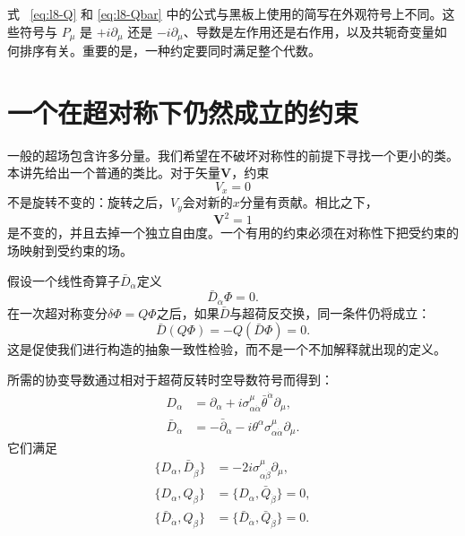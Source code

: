 式 ~\eqref{eq:l8-Q} 和 \eqref{eq:l8-Qbar} 中的公式与黑板上使用的简写在外观符号上不同。这些符号与 \(P_\mu\) 是 \(+i\partial_\mu\) 还是 \(-i\partial_\mu\)、导数是左作用还是右作用，以及共轭奇变量如何排序有关。重要的是，一种约定要同时满足整个代数。

\section{一个在超对称下仍然成立的约束}

一般的超场包含许多分量。我们希望在不破坏对称性的前提下寻找一个更小的类。本讲先给出一个普通的类比。对于矢量\(\mathbf V\)，约束
\begin{equation}
V_x=0
\end{equation}
不是旋转不变的：旋转之后，\(V_y\)会对新的\(x\)分量有贡献。相比之下，
\begin{equation}
\mathbf V^2=1
\end{equation}
是不变的，并且去掉一个独立自由度。一个有用的约束必须在对称性下把受约束的场映射到受约束的场。

假设一个线性奇算子\(\bar D_{\dot\alpha}\)定义
\begin{equation}
\bar D_{\dot\alpha}\Phi=0.
\label{eq:l8-chiral-constraint}
\end{equation}
在一次超对称变分\(\delta\Phi=Q\Phi\)之后，如果\(\bar D\)与超荷反交换，同一条件仍将成立：
\begin{equation}
\bar D(Q\Phi)=-Q(\bar D\Phi)=0.
\end{equation}
这是促使我们进行构造的抽象一致性检验，而不是一个不加解释就出现的定义。

\begin{classroomqa}
\end{classroomqa}

所需的协变导数通过相对于超荷反转时空导数符号而得到：
\begin{align}
D_\alpha
&=\partial_\alpha
+i\sigma^\mu_{\alpha\dot\alpha}
\bar\theta^{\dot\alpha}\partial_\mu,
\label{eq:l8-D}\\
\bar D_{\dot\alpha}
&=-\bar\partial_{\dot\alpha}
-i\theta^\alpha\sigma^\mu_{\alpha\dot\alpha}\partial_\mu.
\label{eq:l8-Dbar}
\end{align}
它们满足
\begin{align}
\{D_\alpha,\bar D_{\dot\beta}\}
&=-2i\sigma^\mu_{\alpha\dot\beta}\partial_\mu,\\
\{D_\alpha,Q_\beta\}
&=\{D_\alpha,\bar Q_{\dot\beta}\}=0,\\
\{\bar D_{\dot\alpha},Q_\beta\}
&=\{\bar D_{\dot\alpha},\bar Q_{\dot\beta}\}=0.
\end{align}

